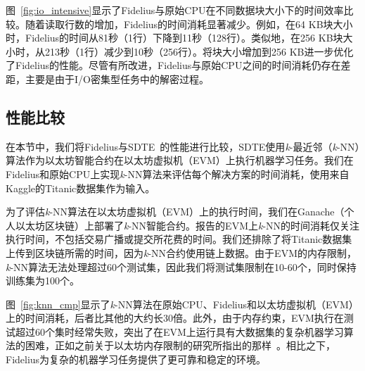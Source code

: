 
图~\ref{fig:io_intensive}显示了Fidelius与原始CPU在不同数据块大小下的时间效率比较。随着读取行数的增加，Fidelius的时间消耗显著减少。例如，在64 KB块大小时，Fidelius的时间从81秒（1行）下降到11秒（128行）。类似地，在256 KB块大小时，从213秒（1行）减少到10秒（256行）。将块大小增加到256 KB进一步优化了Fidelius的性能。尽管有所改进，Fidelius与原始CPU之间的时间消耗仍存在差距，主要是由于I/O密集型任务中的解密过程。

\subsection{性能比较}\label{subsec:evm_cmp}
在本节中，我们将Fidelius与SDTE~\cite{dai2019sdte}的性能进行比较，SDTE使用\textit{k}-最近邻（\textit{k}-NN）算法作为以太坊智能合约在以太坊虚拟机（EVM）上执行机器学习任务。我们在Fidelius和原始CPU上实现\textit{k}-NN算法来评估每个解决方案的时间消耗，使用来自Kaggle的Titanic数据集作为输入。

为了评估\textit{k}-NN算法在以太坊虚拟机（EVM）上的执行时间，我们在Ganache（个人以太坊区块链）上部署了\textit{k}-NN智能合约。报告的EVM上\textit{k}-NN的时间消耗仅关注执行时间，不包括交易广播或提交所花费的时间。我们还排除了将Titanic数据集上传到区块链所需的时间，因为\textit{k}-NN合约使用链上数据。由于EVM的内存限制，\textit{k}-NN算法无法处理超过60个测试集，因此我们将测试集限制在10-60个，同时保持训练集为100个。


图~\ref{fig:knn_cmp}显示了\textit{k}-NN算法在原始CPU、Fidelius和以太坊虚拟机（EVM）上的时间消耗，后者比其他的大约长30倍。此外，由于内存约束，EVM执行在测试超过60个集时经常失败，突出了在EVM上运行具有大数据集的复杂机器学习算法的困难，正如之前关于以太坊内存限制的研究所指出的那样~\cite{dinh2017blockbench}。相比之下，Fidelius为复杂的机器学习任务提供了更可靠和稳定的环境。 